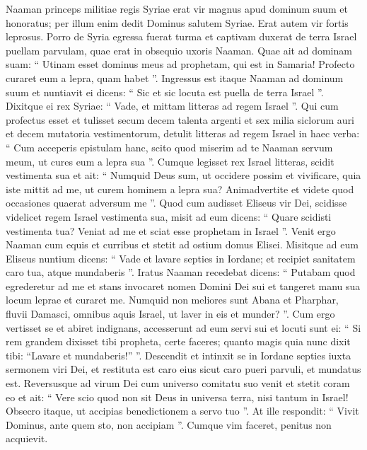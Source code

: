 \begin{biblechapter}
\begin{biblechapter}
\begin{biblechapter}
\begin{biblechapter}
\begin{biblechapter}
 \verse Naaman princeps militiae regis Syriae erat vir magnus apud dominum suum et honoratus; per illum enim dedit Dominus salutem Syriae. Erat autem vir fortis leprosus. 
\verse Porro de Syria egressa fuerat turma et captivam duxerat de terra Israel puellam parvulam, quae erat in obsequio uxoris Naaman. 
\verse Quae ait ad dominam suam: “ Utinam esset dominus meus ad prophetam, qui est in Samaria! Profecto curaret eum a lepra, quam habet ”. 
\verse Ingressus est itaque Naaman ad dominum suum et nuntiavit ei dicens: “ Sic et sic locuta est puella de terra Israel ”. 
\verse Dixitque ei rex Syriae: “ Vade, et mittam litteras ad regem Israel ”. Qui cum profectus esset et tulisset secum decem talenta argenti et sex milia siclorum auri et decem mutatoria vestimentorum, 
\verse detulit litteras ad regem Israel in haec verba: “ Cum acceperis epistulam hanc, scito quod miserim ad te Naaman servum meum, ut cures eum a lepra sua ”. 
\verse Cumque legisset rex Israel litteras, scidit vestimenta sua et ait: “ Numquid Deus sum, ut occidere possim et vivificare, quia iste mittit ad me, ut curem hominem a lepra sua? Animadvertite et videte quod occasiones quaerat adversum me ”. 
\verse Quod cum audisset Eliseus vir Dei, scidisse videlicet regem Israel vestimenta sua, misit ad eum dicens: “ Quare scidisti vestimenta tua? Veniat ad me et sciat esse prophetam in Israel ”.
 \verse Venit ergo Naaman cum equis et curribus et stetit ad ostium domus Elisei. 
 \verse Misitque ad eum Eliseus nuntium dicens: “ Vade et lavare septies in Iordane; et recipiet sanitatem caro tua, atque mundaberis ”. 
\verse Iratus Naaman recedebat dicens: “ Putabam quod egrederetur ad me et stans invocaret nomen Domini Dei sui et tangeret manu sua locum leprae et curaret me. 
\verse Numquid non meliores sunt Abana et Pharphar, fluvii Damasci, omnibus aquis Israel, ut laver in eis et munder? ”. Cum ergo vertisset se et abiret indignans, 
\verse accesserunt ad eum servi sui et locuti sunt ei: “ Si rem grandem dixisset tibi propheta, certe faceres; quanto magis quia nunc dixit tibi: “Lavare et mundaberis!” ”.
 \verse Descendit et intinxit se in Iordane septies iuxta sermonem viri Dei, et restituta est caro eius sicut caro pueri parvuli, et mundatus est.
 \verse Reversusque ad virum Dei cum universo comitatu suo venit et stetit coram eo et ait: “ Vere scio quod non sit Deus in universa terra, nisi tantum in Israel! Obsecro itaque, ut accipias benedictionem a servo tuo ”. 
\verse At ille respondit: “ Vivit Dominus, ante quem sto, non accipiam ”. Cumque vim faceret, penitus non acquievit. 

\end{biblechapter}
\end{biblechapter}
\end{biblechapter}
\end{biblechapter}
\end{biblechapter}
